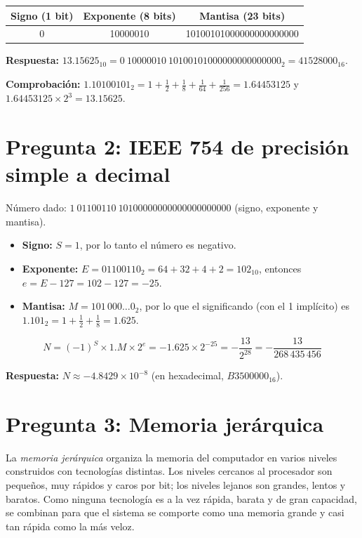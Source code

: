 \documentclass[10pt]{article}
\begin{document}
\begin{center}
\begin{tabular}{|c|c|c|}
  \hline
  \textbf{Signo (1 bit)} & \textbf{Exponente (8 bits)} & \textbf{Mantisa (23 bits)} \\
  \hline
  0 & 10000010 & 10100101000000000000000 \\
  \hline
\end{tabular}
\end{center}
 
\textbf{Respuesta:} $13.15625_{10} = 0\ 10000010\ 10100101000000000000000_2 = 41528000_{16}$.
 
\textbf{Comprobación:} $1.10100101_2 = 1 + \tfrac{1}{2} + \tfrac{1}{8} + \tfrac{1}{64} + \tfrac{1}{256} = 1.64453125$ y $1.64453125 \times 2^{3} = 13.15625$.
 
\section{Pregunta 2: IEEE 754 de precisión simple a decimal}
 
Número dado: $1\ 01100110\ 10100000000000000000000$ (signo, exponente y mantisa).
 
\begin{itemize}
  \item \textbf{Signo:} $S = 1$, por lo tanto el número es negativo.
  \item \textbf{Exponente:} $E = 01100110_2 = 64 + 32 + 4 + 2 = 102_{10}$, entonces $e = E - 127 = 102 - 127 = -25$.
  \item \textbf{Mantisa:} $M = 101\,000\ldots0_2$, por lo que el significando (con el 1 implícito) es $1.101_2 = 1 + \tfrac{1}{2} + \tfrac{1}{8} = 1.625$.
\end{itemize}
 
\[
  N = (-1)^{S} \times 1.M \times 2^{e} = -1.625 \times 2^{-25} = -\frac{13}{2^{28}} = -\frac{13}{268\,435\,456}
\]
 
\textbf{Respuesta:} $N \approx -4.8429 \times 10^{-8}$ (en hexadecimal, $B3500000_{16}$).
 
\section{Pregunta 3: Memoria jerárquica}
 
La \textit{memoria jerárquica} organiza la memoria del computador en varios niveles construidos con tecnologías distintas. Los niveles cercanos al procesador son pequeños, muy rápidos y caros por bit; los niveles lejanos son grandes, lentos y baratos. Como ninguna tecnología es a la vez rápida, barata y de gran capacidad, se combinan para que el sistema se comporte como una memoria grande y casi tan rápida como la más veloz.
 
\end{document}
